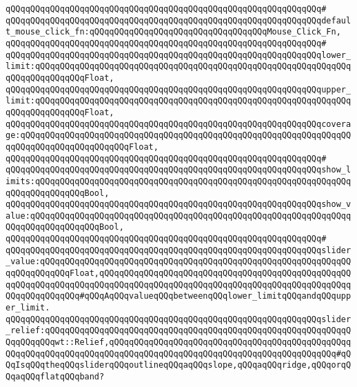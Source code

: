 \verb|qQQqqQQqqQQqqQQqqQQqqQQqqQQqqQQqqQQqqQQqqQQqqQQqqQQqqQQqqQQqqQQq#|\newline
\verb|qQQqqQQqqQQqqQQqqQQqqQQqqQQqqQQqqQQqqQQqqQQqqQQqqQQqqQQqqQQqqQQqdefault_mouse_click_fn:qQQqqQQqqQQqqQQqqQQqqQQqqQQqqQQqqQQqMouse_Click_Fn,|\newline
\verb|qQQqqQQqqQQqqQQqqQQqqQQqqQQqqQQqqQQqqQQqqQQqqQQqqQQqqQQqqQQqqQQq#|\newline
\verb|qQQqqQQqqQQqqQQqqQQqqQQqqQQqqQQqqQQqqQQqqQQqqQQqqQQqqQQqqQQqqQQqlower_limit:qQQqqQQqqQQqqQQqqQQqqQQqqQQqqQQqqQQqqQQqqQQqqQQqqQQqqQQqqQQqqQQqqQQqqQQqqQQqqQQqFloat,|\newline
\verb|qQQqqQQqqQQqqQQqqQQqqQQqqQQqqQQqqQQqqQQqqQQqqQQqqQQqqQQqqQQqqQQqupper_limit:qQQqqQQqqQQqqQQqqQQqqQQqqQQqqQQqqQQqqQQqqQQqqQQqqQQqqQQqqQQqqQQqqQQqqQQqqQQqqQQqFloat,|\newline
\verb|qQQqqQQqqQQqqQQqqQQqqQQqqQQqqQQqqQQqqQQqqQQqqQQqqQQqqQQqqQQqqQQqcoverage:qQQqqQQqqQQqqQQqqQQqqQQqqQQqqQQqqQQqqQQqqQQqqQQqqQQqqQQqqQQqqQQqqQQqqQQqqQQqqQQqqQQqqQQqqQQqFloat,|\newline
\verb|qQQqqQQqqQQqqQQqqQQqqQQqqQQqqQQqqQQqqQQqqQQqqQQqqQQqqQQqqQQqqQQq#|\newline
\verb|qQQqqQQqqQQqqQQqqQQqqQQqqQQqqQQqqQQqqQQqqQQqqQQqqQQqqQQqqQQqqQQqshow_limits:qQQqqQQqqQQqqQQqqQQqqQQqqQQqqQQqqQQqqQQqqQQqqQQqqQQqqQQqqQQqqQQqqQQqqQQqqQQqqQQqBool,|\newline
\verb|qQQqqQQqqQQqqQQqqQQqqQQqqQQqqQQqqQQqqQQqqQQqqQQqqQQqqQQqqQQqqQQqshow_value:qQQqqQQqqQQqqQQqqQQqqQQqqQQqqQQqqQQqqQQqqQQqqQQqqQQqqQQqqQQqqQQqqQQqqQQqqQQqqQQqqQQqBool,|\newline
\verb|qQQqqQQqqQQqqQQqqQQqqQQqqQQqqQQqqQQqqQQqqQQqqQQqqQQqqQQqqQQqqQQq#|\newline
\verb|qQQqqQQqqQQqqQQqqQQqqQQqqQQqqQQqqQQqqQQqqQQqqQQqqQQqqQQqqQQqqQQqslider_value:qQQqqQQqqQQqqQQqqQQqqQQqqQQqqQQqqQQqqQQqqQQqqQQqqQQqqQQqqQQqqQQqqQQqqQQqqQQqFloat,qQQqqQQqqQQqqQQqqQQqqQQqqQQqqQQqqQQqqQQqqQQqqQQqqQQqqQQqqQQqqQQqqQQqqQQqqQQqqQQqqQQqqQQqqQQqqQQqqQQqqQQqqQQqqQQqqQQqqQQqqQQqqQQqqQQqqQQq#qQQqAqQQqvalueqQQqbetweenqQQqlower_limitqQQqandqQQqupper_limit.|\newline
\verb|qQQqqQQqqQQqqQQqqQQqqQQqqQQqqQQqqQQqqQQqqQQqqQQqqQQqqQQqqQQqqQQqslider_relief:qQQqqQQqqQQqqQQqqQQqqQQqqQQqqQQqqQQqqQQqqQQqqQQqqQQqqQQqqQQqqQQqqQQqqQQqwt::Relief,qQQqqQQqqQQqqQQqqQQqqQQqqQQqqQQqqQQqqQQqqQQqqQQqqQQqqQQqqQQqqQQqqQQqqQQqqQQqqQQqqQQqqQQqqQQqqQQqqQQqqQQqqQQqqQQqqQQq#qQQqIsqQQqtheqQQqsliderqQQqoutlineqQQqaqQQqslope,qQQqaqQQqridge,qQQqorqQQqaqQQqflatqQQqband?|\newline
